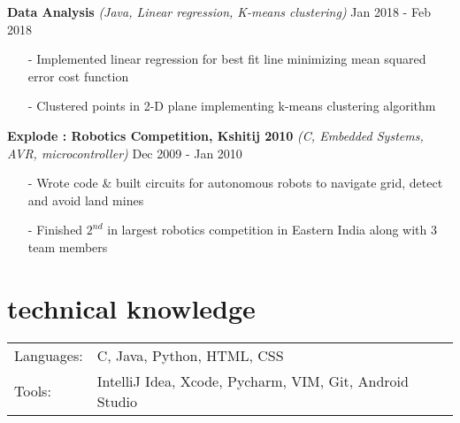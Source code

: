 \documentclass[a4paper, 10pt, oneside]{article}
\newcommand{\bulltetspace}{\vspace{-0.2em}}
\begin{document}
\begin{center}
\color{headings}\textbf{Data Analysis} \textit{(Java, Linear regression, K-means clustering)} \hfill Jan 2018 - Feb 2018
\color{text1}
\vspace{-0.3em}
\begin{itemize}
\bulltetspace
\item[-] Implemented linear regression for best fit line minimizing mean squared error cost function\\
\bulltetspace
\item[-] Clustered points in 2-D plane implementing k-means clustering algorithm
\vspace{0.0em}
\end{itemize}


 \color{headings}\textbf{Explode : Robotics Competition, Kshitij 2010 } \textit{(C, Embedded Systems, AVR, microcontroller)} \hfill Dec 2009 - Jan 2010
\color{text1}
\vspace{-0.3em}
\begin{itemize}
\bulltetspace
\item[-] Wrote code \& built circuits for autonomous robots to navigate grid, detect and avoid land mines\\
\bulltetspace
\item[-] Finished $2^{nd}$ in largest robotics competition in Eastern India along with 3 team members
\vspace{0.0em}
\end {itemize}
\end{center}


\vspace{-1em}
\section{\color{headings}technical knowledge}
\vspace{-0.5em}
\color{text1}
\raggedright
\begin{tabular}{l l}
Languages: & C, Java, Python, HTML, CSS\\
Tools: & IntelliJ Idea, Xcode, Pycharm, VIM, Git, Android Studio\\
\end{tabular}
\end{document}
